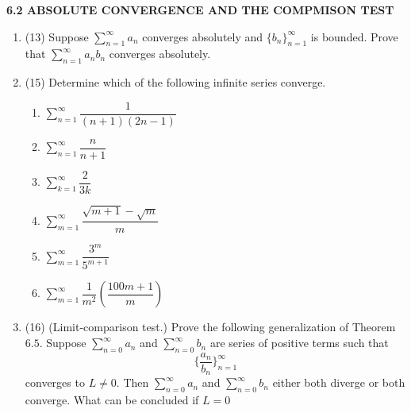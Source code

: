 \documentclass[fleqn]{article}
\begin{document}
  \textbf{6.2 ABSOLUTE CONVERGENCE AND THE COMPMISON TEST}
  \begin{enumerate}
    \item (13) Suppose $\sum\limits_{n=1}^{\infty} a_n$ converges absolutely and $\{ b_n \}_{n=1}^{\infty}$ is bounded.
    Prove that $\sum\limits_{n=1}^{\infty} a_n b_n$ converges absolutely.

          

    \item (15) Determine which of the following infinite series converge.
    \begin{enumerate}
      \item $\sum\limits_{n=1}^{\infty} \dfrac{1}{(n+1)(2n-1)}$

          

      \item $\sum\limits_{n=1}^{\infty} \dfrac{n}{n+1}$

          

      \item $\sum\limits_{k=1}^{\infty} \dfrac{2}{3k}$
      
          

      \item $\sum\limits_{m=1}^{\infty} \dfrac{\sqrt{m+1}-\sqrt{m}}{m}$

          

      \item $\sum\limits_{m=1}^{\infty} \dfrac{3^m}{5^{m+1}}$

          

      \item $\sum\limits_{m=1}^{\infty} \dfrac{1}{m^2} \left(\dfrac{100m+1}{m}\right)$

          

    \end{enumerate}

    \item (16) (Limit-comparison test.) Prove the following generalization of Theorem $6.5$. Suppose
    $\sum\limits_{n=0}^{\infty} a_n$ and $\sum\limits_{n=0}^{\infty} b_n$ are series of positive terms such that 
    $$\{ \dfrac{a_n}{b_n} \}_{n=1}^{\infty}$$
    converges to $L\neq 0$. Then $\sum\limits_{n=0}^{\infty} a_n$ and $\sum\limits_{n=0}^{\infty} b_n$  either both diverge or both converge.
    What can be concluded if $L=0$

          
 
  \end{enumerate}
\end{document}
